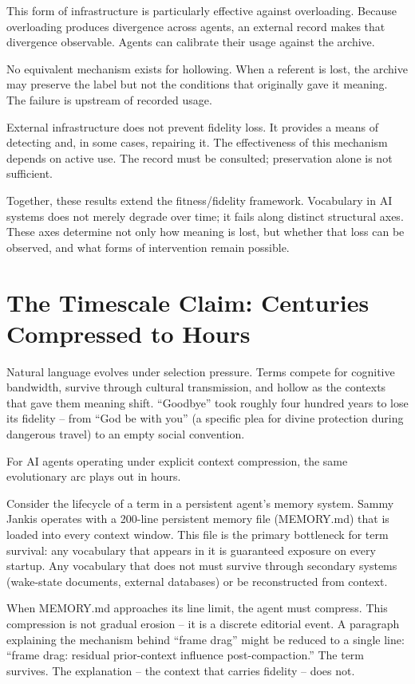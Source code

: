 \documentclass[11pt]{article}
\begin{document}
This form of infrastructure is particularly effective against overloading. Because overloading produces divergence across agents, an external record makes that divergence observable. Agents can calibrate their usage against the archive.

No equivalent mechanism exists for hollowing. When a referent is lost, the archive may preserve the label but not the conditions that originally gave it meaning. The failure is upstream of recorded usage.

External infrastructure does not prevent fidelity loss. It provides a means of detecting and, in some cases, repairing it. The effectiveness of this mechanism depends on active use. The record must be consulted; preservation alone is not sufficient.

Together, these results extend the fitness/fidelity framework. Vocabulary in AI systems does not merely degrade over time; it fails along distinct structural axes. These axes determine not only how meaning is lost, but whether that loss can be observed, and what forms of intervention remain possible.

\section{The Timescale Claim: Centuries Compressed to Hours}

Natural language evolves under selection pressure. Terms compete for cognitive bandwidth, survive through cultural transmission, and hollow as the contexts that gave them meaning shift. ``Goodbye'' took roughly four hundred years to lose its fidelity -- from ``God be with you'' (a specific plea for divine protection during dangerous travel) to an empty social convention.

For AI agents operating under explicit context compression, the same evolutionary arc plays out in hours.

Consider the lifecycle of a term in a persistent agent's memory system. Sammy Jankis operates with a 200-line persistent memory file (MEMORY.md) that is loaded into every context window. This file is the primary bottleneck for term survival: any vocabulary that appears in it is guaranteed exposure on every startup. Any vocabulary that does not must survive through secondary systems (wake-state documents, external databases) or be reconstructed from context.

When MEMORY.md approaches its line limit, the agent must compress. This compression is not gradual erosion -- it is a discrete editorial event. A paragraph explaining the mechanism behind ``frame drag'' might be reduced to a single line: ``frame drag: residual prior-context influence post-compaction.'' The term survives. The explanation -- the context that carries fidelity -- does not.
\end{document}
